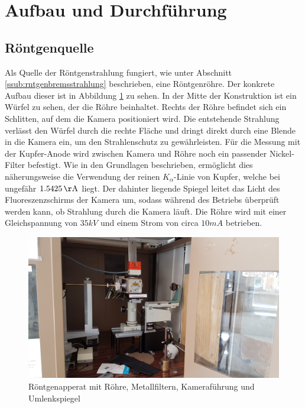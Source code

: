 \section{Aufbau und Durchführung} %
\label{sec:versuchsaufbau}

	\subsection{Röntgenquelle} %
	\label{sub:rntgenquelle}
		
		Als Quelle der Röntgenstrahlung fungiert, wie unter Abschnitt \ref{ssub:rntgenbremsstrahlung} beschrieben, eine Röntgenröhre.
		Der konkrete Aufbau dieser ist in Abbildung \ref{apperat} zu sehen.
		In der Mitte der Konstruktion ist ein Würfel zu sehen, der die Röhre beinhaltet.
		Rechts der Röhre befindet sich ein Schlitten, auf dem die Kamera positioniert wird. 
		Die entstehende Strahlung verlässt den Würfel durch die rechte Fläche und dringt direkt durch eine Blende in die Kamera ein, um den Strahlenschutz zu gewährleisten.
		Für die Messung mit der Kupfer-Anode wird zwischen Kamera und Röhre noch ein passender Nickel-Filter befestigt.
		Wie in den Grundlagen beschrieben, ermöglicht dies näherungsweise die Verwendung der reinen $K_\alpha$-Linie von Kupfer, welche bei ungefähr $1.5425\unit{\AA}$ liegt.
		Der dahinter liegende Spiegel leitet das Licht des Fluoreszenzschirms der Kamera um, sodass während des Betriebs überprüft werden kann, ob Strahlung durch die Kamera läuft.
		Die Röhre wird mit einer Gleichspannung von $35 \unit{kV}$ und einem Strom von circa $ 10 \unit{mA} $ betrieben.

		\begin{figure}[htb]
			\centering
			\includegraphics[scale = 0.12]{images/maschine.jpg}
			\caption{Röntgenapperat mit Röhre, Metallfiltern, Kameraführung und Umlenkspiegel}
			\label{apperat}
		\end{figure}

